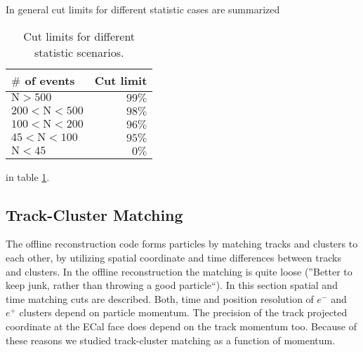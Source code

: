 \documentclass[letterpaper,12pt]{article}
\begin{document}
In general cut limits for different statistic cases are summarized
\begin{table}[!htb]
 \centering
 \begin{tabular}{|l|r|}
  \hline
 \textbf{ $\#$ of events} & \textbf{Cut limit} \\ \hline
  $\mathrm{ N > 500}$ & $99\%$ \\ \hline
  $\mathrm{200 < N < 500}$ & $98\%$ \\ \hline
  $\mathrm{100 < N < 200}$ & $96\%$ \\ \hline
  $\mathrm{45 < N < 100}$ & $95\%$ \\ \hline
  $\mathrm{N < 45}$ & $0\%$ \\ \hline
 \end{tabular}
\caption{Cut limits for different statistic scenarios.}
\label{tb:2DCutLimits}
\end{table}
in table \ref{tb:2DCutLimits}.

\subsection{Track-Cluster Matching}
The offline reconstruction code forms particles by matching tracks and clusters to each other, by utilizing spatial coordinate and time differences between tracks and clusters.
In the offline reconstruction the matching is quite loose (''Better to keep junk, rather than throwing a good particle``). In this section spatial and time matching cuts are described. Both, time and position resolution of $e^{-}$ and $e^{+}$ clusters depend on particle momentum. The precision of the track projected coordinate at the ECal face does depend on the track momentum too. Because of these reasons we studied track-cluster matching as a function of momentum.
\end{document}
